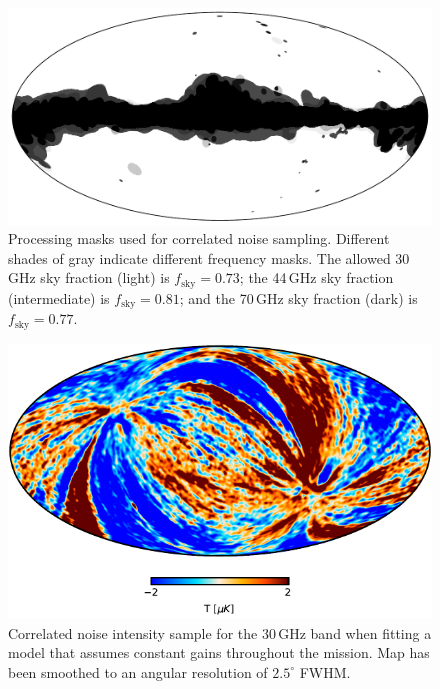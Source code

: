 \documentclass[twocolumn]{aa}
\begin{document}
\begin{figure}
	\begin{center}
		\includegraphics[width=\linewidth]{figs/mask_proc_BP8_v1.pdf}    
	\end{center}
	\caption{Processing masks used for correlated noise
		sampling. Different shades of gray indicate different frequency
		masks. The allowed 30\,GHz sky fraction (light)
		is $f_{\mathrm{sky}}=0.73$; the 44\,GHz sky fraction
		(intermediate) is $f_{\mathrm{sky}}=0.81$; and the 70\,GHz sky fraction
		(dark) is $f_{\mathrm{sky}}=0.77$.
		\label{fig:procmask}}
\end{figure}

\begin{figure}
	\begin{center}
		\includegraphics[width=\linewidth]{figs/ncorr_without_timedep_I_30GHz.pdf}
	\end{center}
	\caption{Correlated noise intensity sample for the 30\,GHz
          band when fitting a model that assumes constant gains throughout
          the mission. Map has been smoothed to an angular resolution
          of $2.5^{\circ}$ FWHM. 
		\label{fig:gain_trouble}}
\end{figure}
\end{document}

